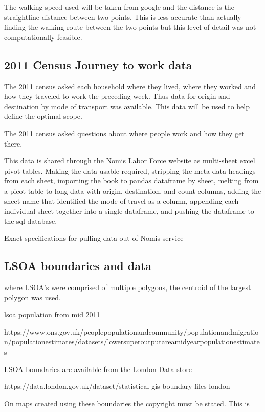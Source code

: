The walking speed used will be taken from google and the distance is the straightline distance between two points. This is less accurate than actually finding the walking route between the two points but this level of detail was not computationally feasible. 

\subsection{2011 Census Journey to work data}

The 2011 census asked each household where they lived, where they worked and how they traveled to work the preceding week. Thus data for origin and destination by mode of transport was available. This data will be used to help define the optimal scope. 

\cite{jtw}

The 2011 census asked questions about where people work and how they get there. 

This data is shared through the Nomis Labor Force website as multi-sheet excel pivot tables. Making the data usable required, stripping the meta data headings from each sheet, importing the book to pandas dataframe by sheet, melting from a picot table to long data with origin, destination, and count columns, adding the sheet name that identified the mode of travel as a column, appending each individual sheet together into a single dataframe, and pushing the dataframe to the sql database. 


Exact specifications for pulling data out of Nomis service

\subsection{LSOA boundaries and data}
	
where LSOA's were comprised of multiple polygons, the centroid of the largest polygon was used. 

lsoa population from mid 2011 

https://www.ons.gov.uk/peoplepopulationandcommunity/populationandmigration/populationestimates/datasets/lowersuperoutputareamidyearpopulationestimates

LSOA boundaries are available from the London Data store



https://data.london.gov.uk/dataset/statistical-gis-boundary-files-london

On maps created using these boundaries the copyright must be stated. This is
	
